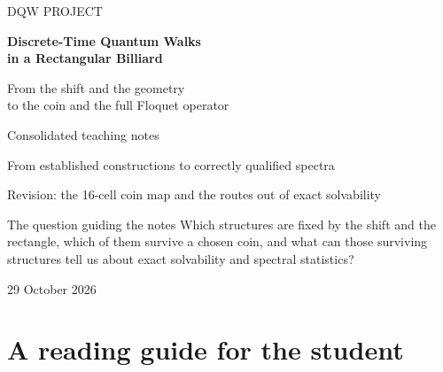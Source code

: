 \documentclass[11pt,a4paper,oneside]{report}
\numberwithin{equation}{chapter}
\begin{document}
\hypersetup{pageanchor=false}
\begin{titlepage}
\vspace*{18mm}
{\color{accent}\large DQW PROJECT\par}
\vspace{12mm}
{\color{ink}\Huge\bfseries Discrete-Time Quantum Walks\\[3mm]
in a Rectangular Billiard\par}
\vspace{10mm}
{\Large From the shift and the geometry\\
to the coin and the full Floquet operator\par}
\vspace{16mm}
{\large Consolidated teaching notes\par}
{\large From established constructions to correctly qualified spectra\par}
\vspace{3mm}
{\large\color{accent} Revision: the 16-cell coin map and the routes out of exact solvability\par}
\vfill
\begin{lesson}{The question guiding the notes}
Which structures are fixed by the shift and the rectangle, which of
them survive a chosen coin, and what can those surviving structures
tell us about exact solvability and spectral statistics?
\end{lesson}
\vspace{10mm}
29 October 2026
\end{titlepage}
\hypersetup{pageanchor=true}

\chapter*{A reading guide for the student}
\end{document}
